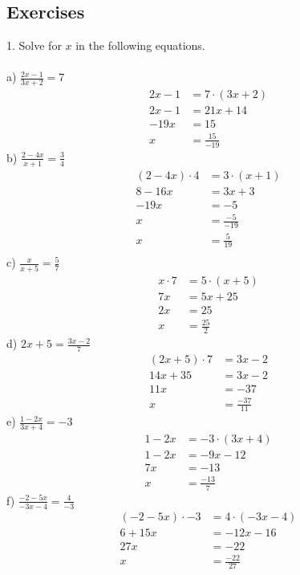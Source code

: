 \documentclass[12pt]{article}
\begin{document}
\subsection*{Exercises}
1. Solve for $x$ in the following equations. \\
\\
a) $\displaystyle \frac{2x-1}{3x+2}=7$
\begin{align*}
2x-1&=7\cdot(3x+2) \\
2x-1&=21x+14 \\
-19x&=15 \\
x&=\displaystyle \frac{15}{-19}
\end{align*}
b) $\displaystyle \frac{2-4x}{x+1}=\displaystyle \frac{3}{4}$
\begin{align*}
(2-4x)\cdot4&=3\cdot(x+1) \\
8-16x&=3x+3 \\
-19x&=-5 \\
x&=\displaystyle \frac{-5}{-19} \\
x&=\displaystyle \frac{5}{19} \\
\end{align*}
c) $\displaystyle \frac{x}{x+5}=\displaystyle \frac{5}{7}$
\begin{align*}
x\cdot7&=5\cdot(x+5) \\
7x&=5x+25 \\
2x&=25 \\
x&=\displaystyle \frac{25}{2}
\end{align*}
d) $2x+5=\displaystyle \frac{3x-2}{7}$
\begin{align*}
(2x+5)\cdot7&=3x-2 \\
14x+35&=3x-2 \\
11x&=-37 \\
x&=\displaystyle \frac{-37}{11}
\end{align*}
e) $\displaystyle \frac{1-2x}{3x+4}=-3$
\begin{align*}
1-2x&=-3\cdot(3x+4) \\
1-2x&=-9x-12 \\
7x&=-13 \\
x&=\displaystyle \frac{-13}{7}
\end{align*}
f) $\displaystyle \frac{-2-5x}{-3x-4}=\displaystyle \frac{4}{-3}$
\begin{align*}
(-2-5x)\cdot-3&=4\cdot(-3x-4) \\
6+15x&=-12x-16 \\
27x&=-22 \\
x&=\displaystyle \frac{-22}{27}
\end{align*}
\end{document}
